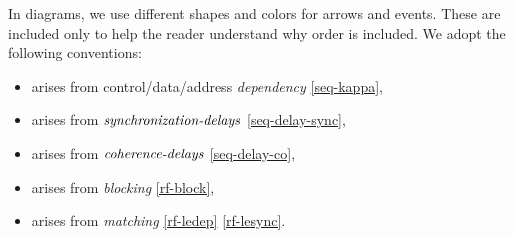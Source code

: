 In diagrams, we use different shapes and colors for arrows and events.  These
are included only to help the reader understand why order is included.  We
adopt the following conventions:
\begin{itemize}  
\item \makebox{$\aEv\xpo\bEv$} arises from control/data/address \emph{dependency} \eqref{seq-kappa},
\item \makebox{$\aEv\xsync\bEv$} arises from $\mathrel{\textnormal{\emph{synchronization-delays}}}$ \eqref{seq-delay-sync},
\item \makebox{$\aEv\xwki\bEv$} arises from $\mathrel{\textnormal{\emph{coherence-delays}}}$ \eqref{seq-delay-co},
\item \makebox{$\aEv\xwk\bEv$} arises from \emph{blocking} \eqref{rf-block},
\item \makebox{$\aEv\xrf\bEv$} arises from \emph{matching} \eqref{rf-ledep} \eqref{rf-lesync}.
\end{itemize}

